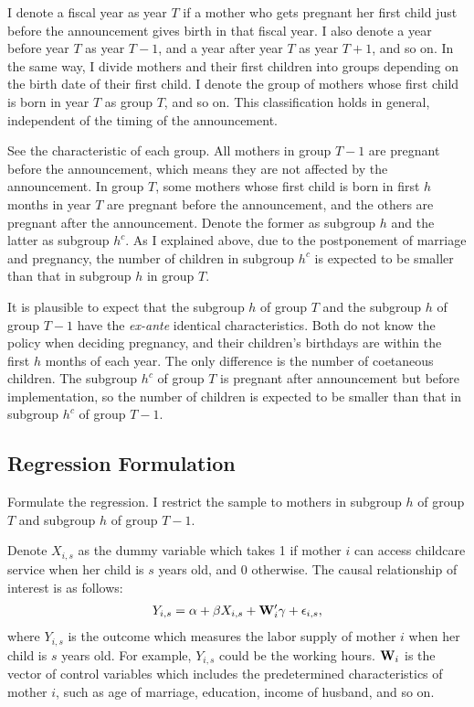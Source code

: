 \documentclass[12pt]{article}
\begin{document}
I denote a fiscal year as year $T$ if a mother who gets pregnant her first child just before the announcement gives birth in that fiscal year.
I also denote a year before year $T$ as year $T-1$, and a year after year $T$ as year $T+1$, and so on.
In the same way, I divide mothers and their first children into groups depending on the birth date of their first child. 
I denote the group of mothers whose first child is born in year $T$ as group $T$, and so on.
This classification holds in general, independent of the timing of the announcement.


See the characteristic of each group.
All mothers in group $T-1$ are pregnant before the announcement, which means they are not affected by the announcement.
In group $T$, some mothers whose first child is born in first $h$ months in year $T$ are pregnant before the announcement, and the others are pregnant after the announcement.
Denote the former as subgroup $h$ and the latter as subgroup $h^c$.
As I explained above, due to the postponement of marriage and pregnancy, the number of children in subgroup $h^c$ is expected to be smaller than that in subgroup $h$ in group $T$.


It is plausible to expect that the subgroup $h$ of group $T$ and the subgroup $h$ of group $T-1$ have the \textit{ex-ante} identical characteristics.
Both do not know the policy when deciding pregnancy, and their children's birthdays are within the first $h$ months of each year. 
The only difference is the number of coetaneous children.
The subgroup $h^c$ of group $T$ is pregnant after announcement but before implementation, so the number of children is expected to be smaller than that in subgroup $h^c$ of group $T-1$.


\subsection*{Regression Formulation}
Formulate the regression.
I restrict the sample to mothers in subgroup $h$ of group $T$ and subgroup $h$ of group $T-1$.


Denote $X_{i,s}$ as the dummy variable which takes 1 if mother $i$ can access childcare service when her child is $s$ years old, and 0 otherwise.
The causal relationship of interest is as follows:
\begin{align}
  Y_{i,s} = \alpha + \beta X_{i,s} + \vb{W}_{i}'\vb{\gamma} + \epsilon_{i,s}, \label{naive}
\end{align}
where $Y_{i,s}$ is the outcome which measures the labor supply of mother $i$ when her child is $s$ years old.
For example, $Y_{i,s}$ could be the working hours. 
$\vb{W}_{i}$ is the vector of control variables which includes the predetermined characteristics of mother $i$, such as age of marriage, education, income of husband, and so on.
\end{document}
